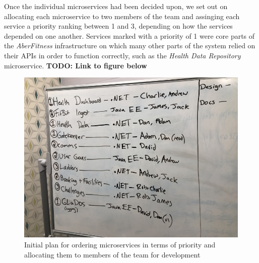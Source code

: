 Once the individual microservices had been decided upon, we set out on allocating each microservice to two members of the team and assinging each service a priority ranking between 1 and 3, depending on how the services depended on one another. Services marked with a priority of 1 were core parts of the \textit{AberFitness} infrastructure on which many other parts of the system relied on their APIs in order to function correctly, such as the \textit{Health Data Repository} microservice.  \textbf{TODO: Link to figure below}

\begin{figure}[H]
    \centering
    \includegraphics[width=\textwidth]{Images/Numbering_Microservices.jpg}
    \caption{Initial plan for ordering microservices in terms of priority and allocating them to members of the team for development}
\end{figure}